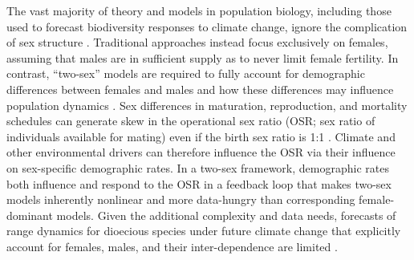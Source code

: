 \documentclass[9pt,twocolumn,twoside,lineno]{pnas-new}
\begin{document}
The vast majority of theory and models in population biology, including those used to forecast biodiversity responses to climate change, ignore the complication of sex structure \citep[but see][] {pottier2021sexual,ellis2017does,Elena}.
Traditional approaches instead focus exclusively on females, assuming that males are in sufficient supply as to never limit female fertility. 
In contrast, ``two-sex'' models are required to fully account for demographic differences between females and males and how these differences may influence population dynamics \citep{gerber2014two,miller2011sex}. 
Sex differences in maturation, reproduction, and mortality schedules can generate skew in the operational sex ratio (OSR; sex ratio of individuals available for mating) even if the birth sex ratio is 1:1 \citep{eberhart2017sex,shelton2010ecological}. 
Climate and other environmental drivers can therefore influence the OSR via their influence on sex-specific demographic rates. 
In a two-sex framework, demographic rates both influence and respond to the OSR in a feedback loop that makes two-sex models inherently nonlinear and more data-hungry than corresponding female-dominant models. 
Given the additional complexity and data needs, forecasts of range dynamics for dioecious species under future climate change that explicitly account for females, males, and their inter-dependence are limited \citep{petry2016sex,lynch2014climate}.
\end{document}
